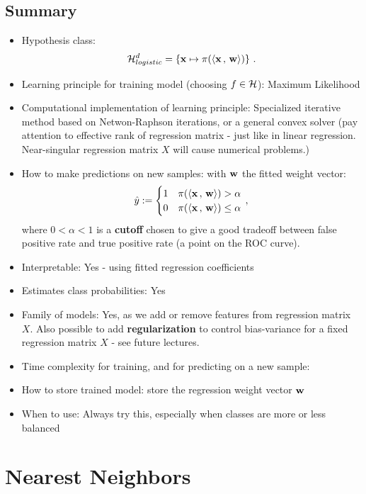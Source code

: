 \subsection{Summary}
\begin{itemize}
  \item Hypothesis class: 
    \[
	\mathcal{H}_{logistic}^d= \left\{ \mathbf{x} \mapsto \pi({\left\langle \mathbf{x}\,,\,\mathbf{w} \right\rangle} ) \right\}\,.
      \]

     \item Learning principle for training model (choosing $f\in\mathcal{H}$): Maximum Likelihood 
    \item Computational implementation of learning principle: Specialized
      iterative method based on Netwon-Raphson
      iterations, or a general convex solver
      (pay attention to effective rank of regression matrix -
      just like in linear regression. Near-singular regression matrix $X$ will
    cause numerical problems.)
  \item How to make predictions on new samples: with $\mathbf{w}$ the fitted weight
    vector:
    \[\hat{y} := \begin{cases} 1 & \pi({\left\langle \mathbf{x}\,,\,\mathbf{w} \right\rangle})>\alpha \\ 0 &
    \pi({\left\langle \mathbf{x}\,,\,\mathbf{w} \right\rangle}) \leq \alpha \end{cases}\,,\]
    where $0<\alpha<1$ is a {\bf cutoff} chosen to give a good tradeoff between
    false positive rate and true positive rate (a point on the ROC curve).
  \item Interpretable: Yes - using fitted regression coefficients
    \item Estimates class probabilities: Yes
  \item Family of models: Yes, as we add or remove features from regression
    matrix $X$. Also possible to add {\bf regularization} to control
    bias-variance for a fixed regression matrix $X$ - see future lectures. 
     \item Time complexity for training, and for predicting on a new sample:
  \item How to store trained model: store the regression weight vector $\mathbf{w}$ 
  \item When to use: Always try this, especially when classes are more or less
    balanced
\end{itemize}


\section{Nearest Neighbors}

